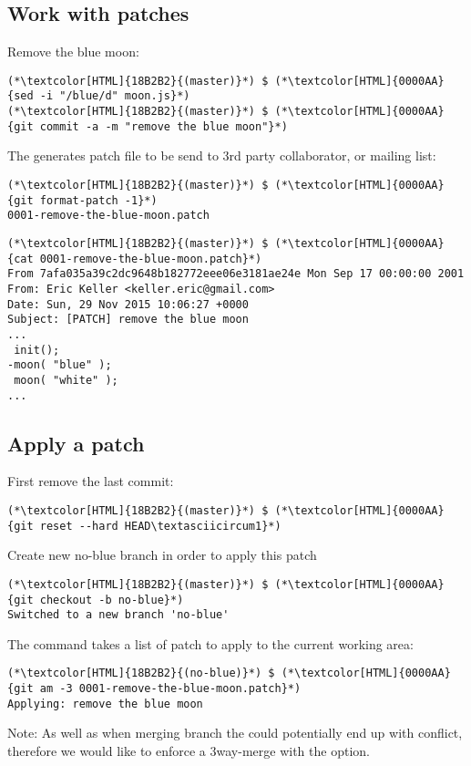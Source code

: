 \subsection{Work with patches}
\begin{frame}[fragile]
    \subslidetitle

  Remove the blue moon:
  \begin{lstlisting}
(*\textcolor[HTML]{18B2B2}{(master)}*) $ (*\textcolor[HTML]{0000AA}{sed -i "/blue/d" moon.js}*)
(*\textcolor[HTML]{18B2B2}{(master)}*) $ (*\textcolor[HTML]{0000AA}{git commit -a -m "remove the blue moon"}*)
\end{lstlisting}

  The  generates patch file to be send to 3rd party collaborator, or mailing list:
  \begin{lstlisting}
(*\textcolor[HTML]{18B2B2}{(master)}*) $ (*\textcolor[HTML]{0000AA}{git format-patch -1}*)
0001-remove-the-blue-moon.patch
\end{lstlisting}

  \begin{lstlisting}
(*\textcolor[HTML]{18B2B2}{(master)}*) $ (*\textcolor[HTML]{0000AA}{cat 0001-remove-the-blue-moon.patch}*)
From 7afa035a39c2dc9648b182772eee06e3181ae24e Mon Sep 17 00:00:00 2001
From: Eric Keller <keller.eric@gmail.com>
Date: Sun, 29 Nov 2015 10:06:27 +0000
Subject: [PATCH] remove the blue moon
...
 init();
-moon( "blue" );
 moon( "white" );
...
\end{lstlisting}

\end{frame}

\subsection{Apply a patch}
\begin{frame}[fragile]
    \subslidetitle
  First remove the last commit:
  \begin{lstlisting}
(*\textcolor[HTML]{18B2B2}{(master)}*) $ (*\textcolor[HTML]{0000AA}{git reset --hard HEAD\textasciicircum1}*)
\end{lstlisting}
  Create new no-blue branch in order to apply this patch
  \begin{lstlisting}
(*\textcolor[HTML]{18B2B2}{(master)}*) $ (*\textcolor[HTML]{0000AA}{git checkout -b no-blue}*)
Switched to a new branch 'no-blue'
\end{lstlisting}

  The  command takes a list of patch to apply to the current working area:
  \begin{lstlisting}
(*\textcolor[HTML]{18B2B2}{(no-blue)}*) $ (*\textcolor[HTML]{0000AA}{git am -3 0001-remove-the-blue-moon.patch}*)
Applying: remove the blue moon
\end{lstlisting}

  Note: As well as when merging branch the  could potentially end up with conflict, therefore we would like to enforce a 3way-merge with the  option.

\end{frame}

